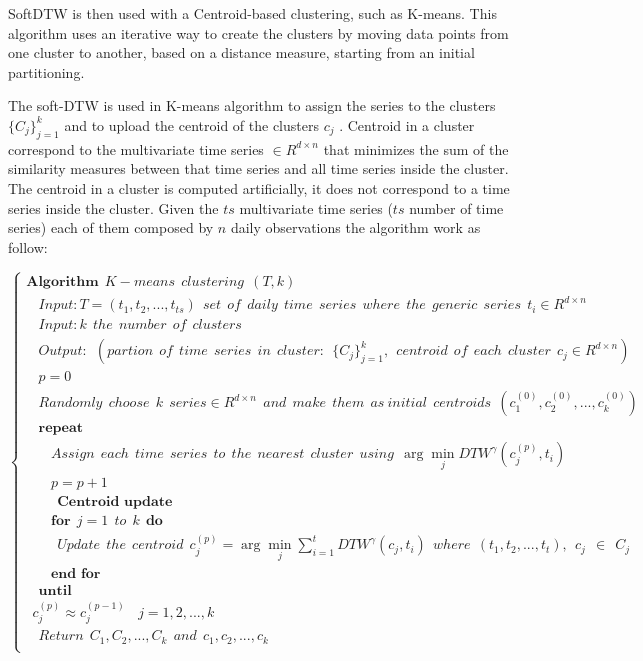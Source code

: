 \documentclass[11pt]{article}
\begin{document}
    SoftDTW is then used with a Centroid-based clustering, such as K-means.
This algorithm uses an iterative way to create the clusters by moving
data points from one cluster to another, based on a distance measure,
starting from an initial partitioning.

The soft-DTW is used in K-means algorithm to assign the series to the
clusters \(\{C_j \}_{j=1}^k\) and to upload the centroid of the clusters
\(c_j\) . Centroid in a cluster correspond to the multivariate time
series \(\in R^{d \times n }\) that minimizes the sum of the similarity
measures between that time series and all time series inside the
cluster. The centroid in a cluster is computed artificially, it does not
correspond to a time series inside the cluster. Given the \(ts\)
multivariate time series (\(ts\) number of time series) each of them
composed by \(n\) daily observations the algorithm work as follow:

    \[
\begin{cases}
\textbf{Algorithm} \ \ K-means \ \ clustering \ \ (T,k) \\
\ \ \ \ Input: T = (t_1, t_2, ..., t_{ts}) \ \ set \ \ of \ \ daily \ \ time \ \ series \ \ where \ \ the  \ \ generic \ \ series \ \ t_i\in R^{d \times n } \\
 \ \ \ \ Input: k \ \ the \ \ number \ \ of \ \ clusters \\
 \ \ \ \ Output:\ \ (partion\ \ of\ \ time\ \ series \ \ in \ \ cluster: \ \ \{C_j \}_{j=1}^k,\ \ centroid\ \ of \ \ each\ \ cluster \ \ c_j\in R^{d \times n }) \\
\ \ \ \ p=0 \\
 \ \ \ \ Randomly \ \ choose \ \ k \ \ series\in R^{d \times n } \ \ and \ \ make \ \ them \ \ as \  initial \ \ centroids \ \ ({c_1^{(0)}, c_2^{(0)}, ..., c_k^{(0)}}) \\ 
 \ \ \ \  \textbf{repeat} \\
  \ \ \ \ \ \ \ \  Assign \ \ each \ \ time \ \ series \ \ to \ \ the \ \ nearest \ \ cluster \ \ using \ \ \arg\min_j DTW^{\gamma}(c_j^{(p)},t_i) \\
  \ \ \ \ \ \ \ \ p=p+1 \\
   \ \ \ \ \ \ \ \ \ \  \textbf{Centroid update} \\
   \ \ \ \ \ \ \ \ \textbf{for} \ \ j=1 \ \ to \ \ k \ \ \textbf{do} \\
    \ \ \ \ \ \ \ \ \ \ Update \ \ the \ \ centroid \ \  c_j^{(p)}= \arg\min_j\sum_{i=1}^{t}DTW^{\gamma}(c_j,t_i) \ \ where\ \ (t_1, t_2, ..., t_{t}),\ \ c_j \ \ \in \ \ C_j \ \ \\
    \ \ \ \ \ \ \ \ \textbf{end for} \\ 
     \ \ \ \  \textbf{until} \\ \ \  c_j^{(p)} \approx  c_j^{(p-1)} \ \  \ \ j = 1, 2, ..., k \\
     \ \ \ \  Return \ \ C_1 ,C_2 ,... ,C_k \ \ and \ \ c_1 ,c_2 ,... ,c_k \\
\end{cases}
\]
\end{document}
